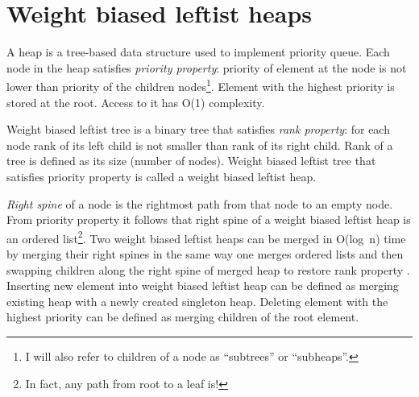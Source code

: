\section{Weight biased leftist heaps}\label{sec:wblh}

A heap is a tree-based data structure used to implement priority queue. Each node in the heap satisfies \textit{priority property}: priority of element at the node is not lower than priority of the children nodes\footnote{I will also refer to children of a node as ``subtrees'' or ``subheaps''.}. Element with the highest priority is stored at the root. Access to it has O(1) complexity.

Weight biased leftist tree \cite{ChoSah96} is a binary tree that satisfies \textit{rank property}: for each node rank of its left child is not smaller than rank of its right child. Rank of a tree is defined as its size (number of nodes). Weight biased leftist tree that satisfies priority property is called a weight biased leftist heap.

\textit{Right spine} of a node is the rightmost path from that node to an empty node. From priority property it follows that right spine of a weight biased leftist heap is an ordered list\footnote{In fact, any path from root to a leaf is!}. Two weight biased leftist heaps can be merged in O(log~n) time by merging their right spines in the same way one merges ordered lists and then swapping children along the right spine of merged heap to restore rank property \cite{Oka99}. Inserting new element into weight biased leftist heap can be defined as merging existing heap with a newly created singleton heap. Deleting element with the highest priority can be defined as merging children of the root element.

